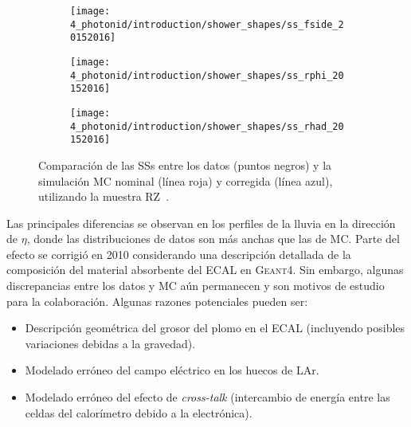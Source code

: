 \begin{figure}[ht!]
    \centering
    \begin{subfigure}[h]{0.32\linewidth}
        \centering
        \texttt{[image: 4\_photonid/introduction/shower\_shapes/ss\_fside\_20152016]}
        \caption{\fside}
        \label{fig:pid_ss:ss_differences:ss:fside}
    \end{subfigure}
    \hfill
    \begin{subfigure}[h]{0.32\linewidth}
        \centering
        \texttt{[image: 4\_photonid/introduction/shower\_shapes/ss\_rphi\_20152016]}
        \caption{\rphi}
        \label{fig:pid_ss:ss_differences:ss:rphi}
    \end{subfigure}
    \hfill
    \begin{subfigure}[h]{0.32\linewidth}
        \centering
        \texttt{[image: 4\_photonid/introduction/shower\_shapes/ss\_rhad\_20152016]}
        \caption{\rhad}
        \label{fig:pid_ss:ss_differences:ss:rhad}
    \end{subfigure}
    \caption{Comparación de las \acp{SS} entre los datos (puntos negros) y la simulación \ac{MC} nominal (línea roja) y corregida (línea azul), utilizando la muestra \ac{RZ}~\cite{ATLAS-EGamma-Calibration-2015-2016}.}
    \label{fig:pid_ss:ss_differences:ss}
\end{figure}

Las principales diferencias se observan en los perfiles de la lluvia en la dirección de \(\eta\), donde las distribuciones de datos son más anchas que las de \ac{MC}. Parte del efecto se corrigió en 2010 considerando una descripción detallada de la composición del material absorbente del \ac{ECAL} en \textsc{Geant4}. Sin embargo, algunas discrepancias entre los datos y \ac{MC} aún permanecen y son motivos de estudio para la colaboración. Algunas razones potenciales pueden ser:
\begin{itemize}
    \item Descripción geométrica del grosor del plomo en el \ac{ECAL} (incluyendo posibles variaciones debidas a la gravedad).
    \item Modelado erróneo del campo eléctrico en los huecos de \ac{LAr}.
    \item Modelado erróneo del efecto de \textit{cross-talk} (intercambio de energía entre las celdas del calorímetro debido a la electrónica).
\end{itemize}


